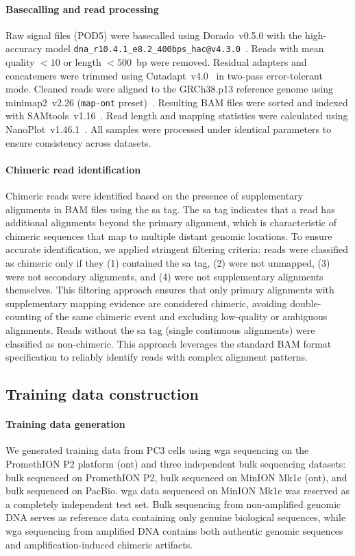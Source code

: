 \documentclass[pdflatex,sn-nature,lineno]{sn-jnl}%
\theoremstyle{thmstyleone}%
\theoremstyle{thmstyletwo}%
\theoremstyle{thmstylethree}%
\begin{document}
\paragraph{Basecalling and read processing}
Raw signal files (POD5) were basecalled using Dorado~v0.5.0 with the high-accuracy model \texttt{dna\_r10.4.1\_e8.2\_400bps\_hac@v4.3.0}~\cite{dorado2023}. Reads with mean quality $< 10$ or length $< 500$~bp were removed. Residual adapters and concatemers were trimmed using Cutadapt~v4.0~\cite{martin2011cutadapt} in two-pass error-tolerant mode. Cleaned reads were aligned to the GRCh38.p13 reference genome using minimap2~v2.26 (\texttt{map-ont} preset)~\cite{li2018minimap2}. Resulting BAM files were sorted and indexed with SAMtools~v1.16~\cite{danecek2021twelve}.
Read length and mapping statistics were calculated using NanoPlot~v1.46.1~\cite{decoster2023nanopack2}.
All samples were processed under identical parameters to ensure consistency across datasets.

\paragraph{Chimeric read identification}
Chimeric reads were identified based on the presence of supplementary alignments in BAM files using the \gls{sa} tag.
The \gls{sa} tag indicates that a read has additional alignments beyond the primary alignment, which is characteristic of chimeric sequences that map to multiple distant genomic locations.
To ensure accurate identification, we applied stringent filtering criteria: reads were classified as chimeric only if they (1) contained the \gls{sa} tag, (2) were not unmapped, (3) were not secondary alignments, and (4) were not supplementary alignments themselves.
This filtering approach ensures that only primary alignments with supplementary mapping evidence are considered chimeric, avoiding double-counting of the same chimeric event and excluding low-quality or ambiguous alignments.
Reads without the \gls{sa} tag (single continuous alignments) were classified as non-chimeric.
This approach leverages the standard BAM format specification to reliably identify reads with complex alignment patterns.

\subsection*{Training data construction}

\paragraph{Training data generation}
We generated training data from PC3 cells using \gls{wga} sequencing on the PromethION P2 platform (\gls{ont}) and three independent bulk sequencing datasets: bulk sequenced on PromethION P2, bulk sequenced on MinION Mk1c (\gls{ont}), and bulk sequenced on PacBio.
\gls{wga} data sequenced on MinION Mk1c was reserved as a completely independent test set.
Bulk sequencing from non-amplified genomic DNA serves as reference data containing only genuine biological sequences, while \gls{wga} sequencing from amplified DNA contains both authentic genomic sequences and amplification-induced chimeric artifacts.
\end{document}
